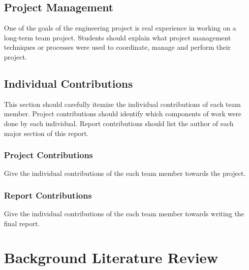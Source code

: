 \documentclass[12pt,draft]{report}
\begin{document}
\section{Project Management}

One of the goals of the engineering project is real experience in working on a long-term team project.  Students should explain what project management techniques or processes were used to coordinate, manage and perform their project.


\section{Individual Contributions}

This section should carefully itemize the individual contributions of each team member. Project contributions should identify which components of work were done by each individual.  Report contributions should list the author of each major section of this report.


\subsection{Project Contributions}

Give the individual contributions of the each team member towards the project.


\subsection{Report Contributions}

Give the individual contributions of the each team member towards writing the
final report.


\chapter{Background Literature Review}

\end{document}
